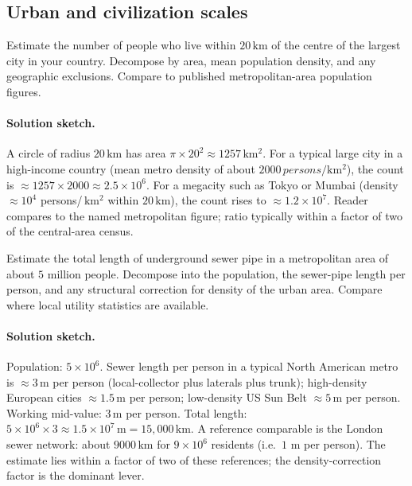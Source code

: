 \subsection*{Urban and civilization scales}

\begin{exercise}
Estimate the number of people who live within $20 \,\si{\kilo\meter}$
of the centre of the largest city in your country. Decompose by area,
mean population density, and any geographic exclusions. Compare to
published metropolitan-area population figures.
\end{exercise}

\paragraph{Solution sketch.}
A circle of radius $20 \,\si{\kilo\meter}$ has area $\pi \times
20^{2} \approx 1257 \,\si{\kilo\meter\squared}$. For a typical
large city in a high-income country (mean metro density of about
$2000 \,\si{persons\per\kilo\meter\squared}$), the count is
$\approx 1257 \times 2000 \approx 2.5 \times 10^{6}$. For a
megacity such as Tokyo or Mumbai (density $\approx 10^{4}$
persons/$\,\si{\kilo\meter\squared}$ within $20 \,\si{\kilo\meter}$),
the count rises to $\approx 1.2 \times 10^{7}$. Reader compares to
the named metropolitan figure; ratio typically within a factor
of two of the central-area census.

\begin{exercise}
Estimate the total length of underground sewer pipe in a metropolitan
area of about $5$ million people. Decompose into the population, the
sewer-pipe length per person, and any structural correction for
density of the urban area. Compare where local utility statistics are
available.
\end{exercise}

\paragraph{Solution sketch.}
Population: $5 \times 10^{6}$. Sewer length per person in a typical
North American metro is $\approx 3 \,\si{\meter}$ per person
(local-collector plus laterals plus trunk); high-density European
cities $\approx 1.5 \,\si{\meter}$ per person; low-density US Sun
Belt $\approx 5 \,\si{\meter}$ per person. Working mid-value: $3
\,\si{\meter}$ per person. Total length: $5 \times 10^{6} \times 3
\approx 1.5 \times 10^{7} \,\si{\meter} = 15{,}000 \,\si{\kilo\meter}$.
A reference comparable is the London sewer network: about $9000
\,\si{\kilo\meter}$ for $9 \times 10^{6}$ residents (i.e.\ $1$ m per
person). The estimate lies within a factor of two of these
references; the density-correction factor is the dominant lever.

